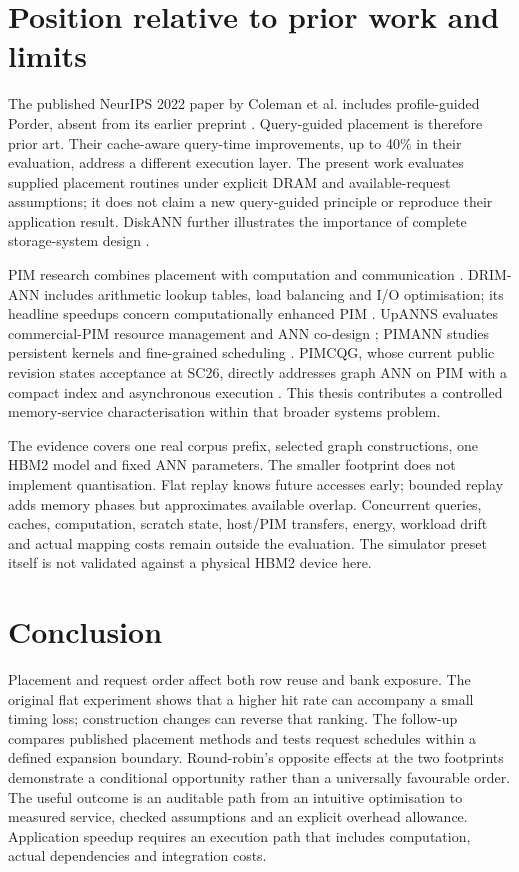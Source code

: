 \documentclass[conference]{IEEEtran}
\begin{document}
\section{Position relative to prior work and limits}
The published NeurIPS 2022 paper by Coleman et al. includes profile-guided Porder, absent from its earlier preprint \cite{coleman}. Query-guided placement is therefore prior art. Their cache-aware query-time improvements, up to 40\% in their evaluation, address a different execution layer. The present work evaluates supplied placement routines under explicit DRAM and available-request assumptions; it does not claim a new query-guided principle or reproduce their application result. DiskANN further illustrates the importance of complete storage-system design \cite{diskann}.

PIM research combines placement with computation and communication \cite{primer}. DRIM-ANN includes arithmetic lookup tables, load balancing and I/O optimisation; its headline speedups concern computationally enhanced PIM \cite{drim}. UpANNS evaluates commercial-PIM resource management and ANN co-design \cite{upanns}; PIMANN studies persistent kernels and fine-grained scheduling \cite{pimann}. PIMCQG, whose current public revision states acceptance at SC26, directly addresses graph ANN on PIM with a compact index and asynchronous execution \cite{pimcqg}. This thesis contributes a controlled memory-service characterisation within that broader systems problem.

The evidence covers one real corpus prefix, selected graph constructions, one HBM2 model and fixed ANN parameters. The smaller footprint does not implement quantisation. Flat replay knows future accesses early; bounded replay adds memory phases but approximates available overlap. Concurrent queries, caches, computation, scratch state, host/PIM transfers, energy, workload drift and actual mapping costs remain outside the evaluation. The simulator preset itself is not validated against a physical HBM2 device here.

\section{Conclusion}
Placement and request order affect both row reuse and bank exposure. The original flat experiment shows that a higher hit rate can accompany a small timing loss; construction changes can reverse that ranking. The follow-up compares published placement methods and tests request schedules within a defined expansion boundary. Round-robin's opposite effects at the two footprints demonstrate a conditional opportunity rather than a universally favourable order. The useful outcome is an auditable path from an intuitive optimisation to measured service, checked assumptions and an explicit overhead allowance. Application speedup requires an execution path that includes computation, actual dependencies and integration costs.

\begingroup\raggedright

\endgroup
\end{document}
